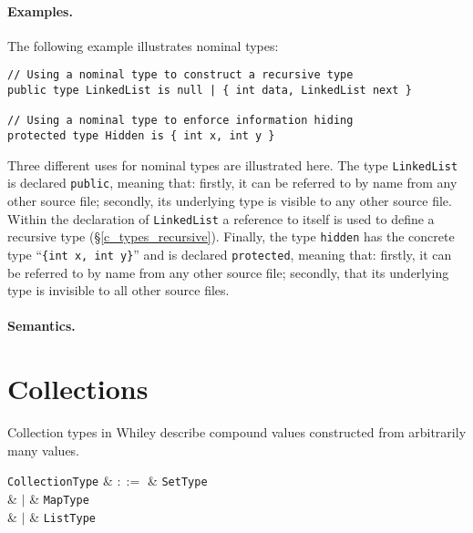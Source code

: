 \paragraph{Examples.}  The following example illustrates nominal types:
\begin{lstlisting}
// Using a nominal type to construct a recursive type
public type LinkedList is null | { int data, LinkedList next }

// Using a nominal type to enforce information hiding
protected type Hidden is { int x, int y }
\end{lstlisting}
Three different uses for nominal types are illustrated here.  The type \lstinline{LinkedList} is declared \lstinline{public}, meaning that: firstly, it can be referred to by name from any other source file; secondly, its underlying type is visible to any other source file.  Within the declaration of \lstinline{LinkedList} a reference to itself is used to define a recursive type (\S\ref{c_types_recursive}).  Finally, the type \lstinline{hidden} has the concrete type ``\lstinline|{int x, int y}|'' and is declared \lstinline{protected}, meaning that: firstly, it can be referred to by name from any other source file; secondly,  that its underlying type is invisible to all other source files.

\paragraph{Semantics.}


\section{Collections}
\label{c_types_collection}

Collection types in Whiley describe compound values constructed from arbitrarily many values.

\begin{syntax}
  \verb+CollectionType+ & $::=$ & \verb+SetType+\\
                        & $|$ & \verb+MapType+\\
                        & $|$ & \verb+ListType+\\
\end{syntax}



